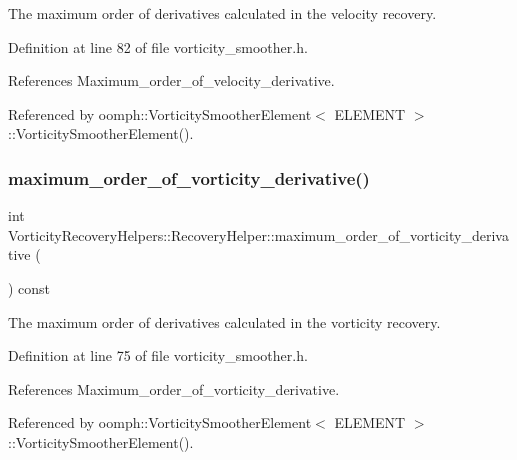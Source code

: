 The maximum order of derivatives calculated in the velocity recovery. 



Definition at line 82 of file vorticity\+\_\+smoother.\+h.



References Maximum\+\_\+order\+\_\+of\+\_\+velocity\+\_\+derivative.



Referenced by oomph\+::\+Vorticity\+Smoother\+Element$<$ E\+L\+E\+M\+E\+N\+T $>$\+::\+Vorticity\+Smoother\+Element().

\mbox{\label{classVorticityRecoveryHelpers_1_1RecoveryHelper_adb6557286bdb253aab24ebb8b8ccf49d}} 
\subsubsection{\texorpdfstring{maximum\+\_\+order\+\_\+of\+\_\+vorticity\+\_\+derivative()}{maximum\_order\_of\_vorticity\_derivative()}}
{\footnotesize\ttfamily int Vorticity\+Recovery\+Helpers\+::\+Recovery\+Helper\+::maximum\+\_\+order\+\_\+of\+\_\+vorticity\+\_\+derivative (\begin{DoxyParamCaption}{ }\end{DoxyParamCaption}) const\hspace{0.3cm}{\ttfamily [inline]}}



The maximum order of derivatives calculated in the vorticity recovery. 



Definition at line 75 of file vorticity\+\_\+smoother.\+h.



References Maximum\+\_\+order\+\_\+of\+\_\+vorticity\+\_\+derivative.



Referenced by oomph\+::\+Vorticity\+Smoother\+Element$<$ E\+L\+E\+M\+E\+N\+T $>$\+::\+Vorticity\+Smoother\+Element().

